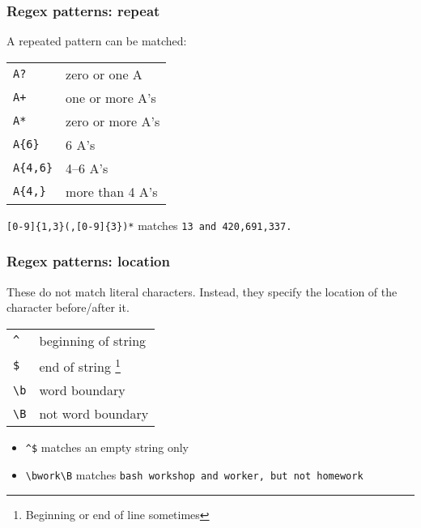 \begin{frame}[fragile]
    \frametitle{Regex patterns: repeat}
    A repeated pattern can be matched:
    \begin{table}
        \centering
        \begin{tabular}{ll}
            \verb|A?|     & zero or one A    \\
            \verb|A+|     & one or more A's  \\  %
            \verb|A*|     & zero or more A's \\ %
            \verb|A{6}|   & 6 A's            \\
            \verb|A{4,6}| & 4--6 A's         \\
            \verb|A{4,}|  & more than 4 A's  \\
        \end{tabular}
    \end{table}

    \begin{example}
        \verb|[0-9]{1,3}(,[0-9]{3})*| matches \tt{13} and \tt{420,691,337}.
    \end{example}
\end{frame}

\begin{frame}[fragile]
    \frametitle{Regex patterns: location}
    These do not match literal characters. Instead, they specify the location of
    the character before/after it.
    \begin{table}
        \centering
        \begin{tabular}{ll}
            \verb|^|  & beginning of string                                         \\
            \verb|$|  & end of string \footnote{Beginning or end of line sometimes} \\
            \verb|\b| & word boundary                                               \\
            \verb|\B| & not word boundary                                           \\
        \end{tabular}
    \end{table}

    \begin{example}
        \begin{itemize}
            \item \verb|^$| matches an empty string only
            \item \verb|\bwork\B| matches \tt{bash workshop} and \tt{worker},
                  but not \tt{homework}
        \end{itemize}
    \end{example}
\end{frame}

